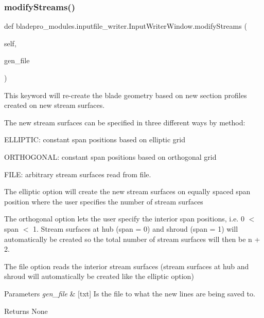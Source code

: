 \subsubsection{\texorpdfstring{modify\+Streams()}{modifyStreams()}}
{\footnotesize\ttfamily def bladepro\+\_\+modules.\+inputfile\+\_\+writer.\+Input\+Writer\+Window.\+modify\+Streams (\begin{DoxyParamCaption}\item[{}]{self,  }\item[{}]{gen\+\_\+file }\end{DoxyParamCaption})}



This keyword will re-\/create the blade geometry based on new section profiles created on new stream surfaces. 

The new stream surfaces can be specified in three different ways by method\+:

\begin{DoxyItemize}
\item {\ttfamily E\+L\+L\+I\+P\+T\+IC\+:} constant span positions based on elliptic grid \item {\ttfamily O\+R\+T\+H\+O\+G\+O\+N\+AL\+:} constant span positions based on orthogonal grid \item {\ttfamily F\+I\+LE\+:} arbitrary stream surfaces read from file.\end{DoxyItemize}
The elliptic option will create the new stream surfaces on equally spaced span position where the user specifies the number of stream surfaces

The orthogonal option lets the user specify the interior span positions, i.\+e. 0 $<$ span $<$ 1. Stream surfaces at hub (span = 0) and shroud (span = 1) will automatically be created so the total number of stream surfaces will then be n + 2.

The file option reads the interior stream surfaces (stream surfaces at hub and shroud will automatically be created like the elliptic option)


\begin{DoxyParams}{Parameters}
{\em gen\+\_\+file} & \mbox{[}txt\mbox{]} Is the file to what the new lines are being saved to. \\
\hline
\end{DoxyParams}
\begin{DoxyReturn}{Returns}
None 
\end{DoxyReturn}
\hypertarget{a00070_ade4195a752861e46586e7b163136620f}{}\label{a00070_ade4195a752861e46586e7b163136620f} 
